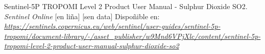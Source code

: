 \begin{thebibliography}{99}
     Sentinel-5P TROPOMI Level 2 Product User Manual - Sulphur Dioxide SO2. \textit{Sentinel Online} [en liña] [sen data] Dispoñible en: \textit{\url{https://sentinels.copernicus.eu/web/sentinel/user-guides/sentinel-5p-tropomi/document-library/-/asset_publisher/w9Mnd6VPjXlc/content/sentinel-5p-tropomi-level-2-product-user-manual-sulphur-dioxide-so2}}





\end{thebibliography}

